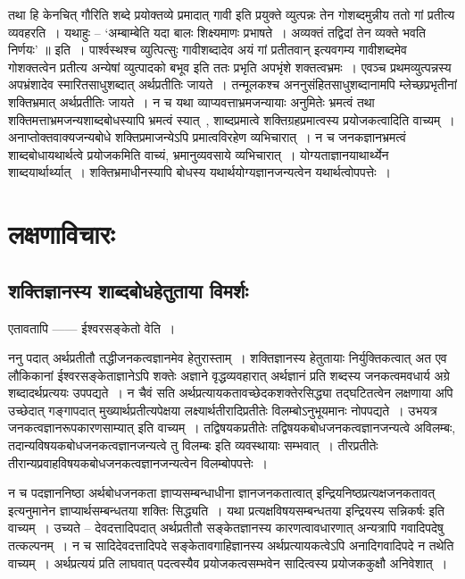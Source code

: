 			तथा हि केनचित् गौरिति शब्दे प्रयोक्तव्ये प्रमादात् गावी इति प्रयुक्ते व्युत्पन्नः तेन गोशब्दमुन्नीय ततो गां प्रतीत्य व्यवहरति~। यथाहुः – ‘अम्बाम्बेति यदा बालः शिक्ष्यमाणः प्रभाषते~। अव्यक्तं तद्विदां तेन व्यक्ते भवति निर्णयः’ ॥ इति~। पार्श्वस्थश्च व्युत्पित्सुः गावीशब्दादेव अयं गां प्रतीतवान् इत्यवगम्य गावीशब्दमेव गोशक्तत्वेन प्रतीत्य अन्येषां व्युत्पादको बभूव इति ततः प्रभृति अपभृंशे शक्तत्वभ्रमः~। एवञ्च प्रथमव्युत्पन्नस्य अपभ्रंशादेव स्मारितसाधुशब्दात् अर्थप्रतीतिः जायते~। तन्मूलकश्च अननुसंहितसाधुशब्दानामपि म्लेच्छप्रभृतीनां शक्तिभ्रमात् अर्थप्रतीतिः जायते~। न च यथा व्याप्यवत्ताभ्रमजन्यायाः अनुमितेः भ्रमत्वं तथा शक्तिमत्ताभ्रमजन्यशाब्दबोधस्यापि भ्रमत्वं स्यात्~, शाब्दप्रमात्वे शक्तिग्रहप्रमात्वस्य प्रयोजकत्वादिति वाच्यम्~। अनाप्तोक्तवाक्यजन्यबोधे शक्तिप्रमाजन्येऽपि प्रमात्वविरहेण व्यभिचारात्~। न च जनकज्ञानभ्रमत्वं शाब्दबोधायथार्थत्वे प्रयोजकमिति वाच्यं, भ्रमानुव्यवसाये व्यभिचारात्~। योग्यताज्ञानयाथार्थ्येन शाब्दयार्थार्थ्यात्~। शक्तिभ्रमाधीनस्यापि  बोधस्य यथार्थयोग्यज्ञानजन्यत्वेन यथार्थत्वोपपत्तेः~। 

\chapter{लक्षणाविचारः}

	\section{शक्तिज्ञानस्य शाब्दबोधहेतुताया विमर्शः}

		एतावतापि ------ ईश्वरसङ्केतो वेति~।
		
		ननु पदात् अर्थप्रतीतौ तद्धीजनकत्वज्ञानमेव हेतुरास्ताम्~। शक्तिज्ञानस्य हेतुतायाः निर्युक्तिकत्वात् अत एव लौकिकानां ईश्वरसङ्केताज्ञानेऽपि शक्तेः अज्ञाने वृद्धव्यवहारात् अर्थज्ञानं प्रति शब्दस्य जनकत्वमवधार्य अग्रे शब्दादर्थप्रत्ययः उपपद्यते~। न चैवं सति अर्थप्रत्यायकतावच्छेदकशक्तेरसिद्ध्या तद्घटितत्वेन लक्षणाया अपि उच्छेदात् गङ्गापदात् मुख्यार्थप्रतीत्यपेक्षया लक्ष्यार्थतीरादिप्रतीतेः विलम्बोऽनुभूयमानः नोपपद्यते~। उभयत्र जनकत्वज्ञानरूपकारणसाम्यात् इति वाच्यम्~। तद्विषयकप्रतीतेः तद्विषयकबोधजनकत्वज्ञानजन्यत्वे अविलम्बः, तदान्यविषयकबोधजनकत्वज्ञानजन्यत्वे तु विलम्बः इति व्यवस्थायाः सम्भवात्~। तीरप्रतीतेः तीरान्यप्रवाहविषयकबोधजनकत्वज्ञानजन्यत्वेन विलम्बोपपत्तेः~। 

		न च पदज्ञाननिष्ठा अर्थबोधजनकता ज्ञाप्यसम्बन्धाधीना ज्ञानजनकतात्वात् इन्द्रियनिष्ठप्रत्यक्षजनकतावत् इत्यनुमानेन ज्ञाप्यार्थसम्बन्धतया शक्तिः सिद्ध्यति~। यथा प्रत्यक्षविषयसम्बन्धतया इन्द्रियस्य सन्निकर्षः इति वाच्यम्~। उच्यते – देवदत्तादिपदात् अर्थप्रतीतौ सङ्केतज्ञानस्य कारणत्वावधारणात् अन्यत्रापि गवादिपदेषु तत्कल्पनम्~। न च सादिदेवदत्तादिपदे सङ्केतावगाहिज्ञानस्य अर्थप्रत्यायकत्वेऽपि अनादिगवादिपदे न तथेति वाच्यम्~। अर्थप्रत्ययं प्रति लाघवात् पदत्वस्यैव प्रयोजकत्वसम्भवेन सादित्वस्य प्रयोजककुक्षौ अनिवेशात्~। 

